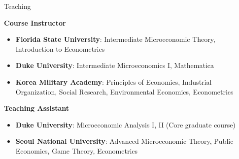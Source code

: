 \begin{rSection}{Teaching}


\textbf{Course Instructor}	
\begin{itemize}
	\item[] \textbf{Florida State University}: Intermediate Microeconomic Theory, Introduction to Econometrics
	\item[] \textbf{Duke University}: Intermediate Microeconomics I, Mathematica 
	\item[] \textbf{Korea Military Academy}: Principles of Economics, Industrial Organization, Social Research, Environmental Economics, Econometrics 
\end{itemize}

\textbf{Teaching Assistant}
\begin{itemize}
	\item[] \textbf{Duke University}: Microeconomic Analysis I, II (Core graduate course) 
	\item[] \textbf{Seoul National University}: Advanced Microeconomic Theory, Public Economics, Game Theory, Econometrics
\end{itemize}


\begin{comment}
	\textbf{Duke University} \hfill { \textbf{Teaching Assistant}}
	
	\hspace*{20pt}	Microeconomic Analysis I, II (Graduate Level) 
	
	\smallskip
	\textbf{Korea Military Academy} \hfill { \textbf{Lecturer}}
	
	\hspace*{20pt} Principles of Economics,
	Industrial Organization,
	Social Research,
	
	\hspace*{20pt}		Environmental Economics,
	Econometrics 
	
	\smallskip
	\textbf{Seoul National University} \hfill {\textbf{Teaching Assistant} }
	
	\hspace*{20pt} Advanced Microeconomic Theory,
	Public Economics, 
	Game Theory, 
	Econometrics 
\end{comment}




\end{rSection}